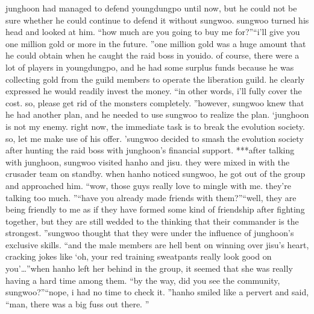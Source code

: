 junghoon had managed to defend youngdungpo until now, but he could not be sure whether he could continue to defend it without sungwoo.
sungwoo turned his head and looked at him.
“how much are you going to buy me for?”“i’ll give you one million gold or more in the future.
”one million gold was a huge amount that he could obtain when he caught the raid boss in youido.
of course, there were a lot of players in youngdungpo, and he had some surplus funds because he was collecting gold from the guild members to operate the liberation guild.
 he clearly expressed he would readily invest the money.
“in other words, i’ll fully cover the cost.
 so, please get rid of the monsters completely.
”however, sungwoo knew that he had another plan, and he needed to use sungwoo to realize the plan.
‘junghoon is not my enemy.
 right now, the immediate task is to break the evolution society.
 so, let me make use of his offer.
’sungwoo decided to smash the evolution society after hunting the raid boss with junghoon’s financial support.
***after talking with junghoon, sungwoo visited hanho and jisu.
 they were mixed in with the crusader team on standby.
 when hanho noticed sungwoo, he got out of the group and approached him.
“wow, those guys really love to mingle with me.
 they’re talking too much.
”“have you already made friends with them?”“well, they are being friendly to me as if they have formed some kind of friendship after fighting together, but they are still wedded to the thinking that their commander is the strongest.
”sungwoo thought that they were under the influence of junghoon’s exclusive skills.
“and the male members are hell bent on winning over jisu’s heart, cracking jokes like ‘oh, your red training sweatpants really look good on you’…”when hanho left her behind in the group, it seemed that she was really having a hard time among them.
“by the way, did you see the community, sungwoo?”“nope, i had no time to check it.
”hanho smiled like a pervert and said, “man, there was a big fuss out there.
”

